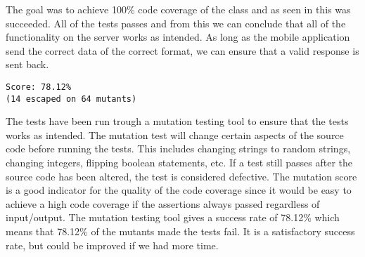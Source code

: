 The goal was to achieve 100\% code coverage of the  class and as seen in  this was succeeded. All of the tests passes and from this we can conclude that all of the functionality on the server works as intended. As long as the mobile application send the correct data of the correct format, we can ensure that a valid response is sent back.

\begin{lstlisting}[numbers=none, basicstyle=\ttfamily, caption={The result of the Mutagenesis test.}]
Score: 78.12%
(14 escaped on 64 mutants)
\end{lstlisting}

The tests have been run trough a mutation testing tool\cite{mutagenesis} to ensure that the tests works as intended. The mutation test will change certain aspects of the source code before running the tests. This includes changing strings to random strings, changing integers, flipping boolean statements, etc. If a test still passes after the source code has been altered, the test is considered defective. The mutation score is a good indicator for the quality of the code coverage since it would be easy to achieve a high code coverage if the assertions always passed regardless of input/output. The mutation testing tool gives a success rate of 78.12\% which means that 78.12\% of the mutants made the tests fail. It is a satisfactory success rate, but could be improved if we had more time.


